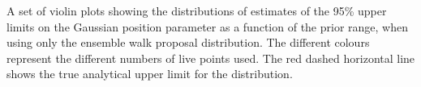 \label{fig:walkpropuls}
A set of violin plots showing the distributions of estimates of the 95\% upper limits on the Gaussian position parameter as a function of the prior range, when using only the ensemble walk proposal distribution. The different colours represent the different numbers of live points  used. The red dashed horizontal line shows the true analytical upper limit for the distribution.

